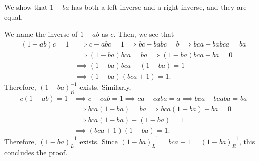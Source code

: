 \documentclass[12pt]{article}
\begin{document}
\begin{fproof}[Jacobson 2.2.4]
  We show that \(1-ba\) has both a left inverse and a right inverse, and they are equal.

  We name the inverse of \(1-ab\) as \(c\). Then, we see that
  \begin{align*}
    (1-ab)c = 1 & \implies c - abc = 1 \implies bc - babc = b \implies bca - babca = ba \\
    & \implies (1-ba)bca = ba \implies (1-ba)bca - ba = 0\\
    & \implies (1-ba)bca + (1-ba) = 1\\
    & \implies (1-ba)(bca + 1) = 1.
  \end{align*}
  Therefore, \((1-ba)^{-1}_R\) exists.
  Similarly,
  \begin{align*}
    c(1-ab) = 1 & \implies c - cab = 1 \implies ca - caba = a \implies bca - bcaba = ba\\
    & \implies bca(1-ba) = ba \implies bca(1-ba) - ba = 0\\
    & \implies bca(1-ba) + (1-ba) = 1\\
    & \implies (bca + 1)(1-ba) = 1.
  \end{align*}
  Therefore, \((1-ba)^{-1}_L\) exists.
  Since \((1-ba)^{-1}_L = bca+1 = (1-ba)^{-1}_R\), this concludes the proof.
\end{fproof}
\newpage

\begin{fproof}[Jacobson 2.2.6]

\end{fproof}
\newpage

\begin{fproof}[Jacobson 2.2.7]\

\end{fproof}
\end{document}

